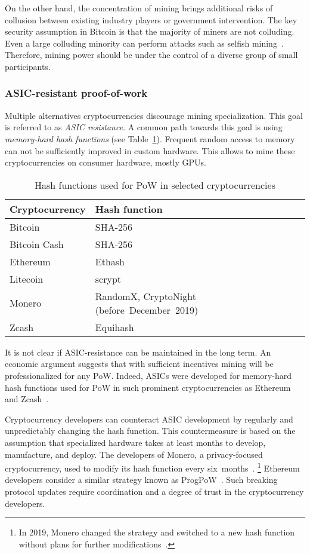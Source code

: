 On the other hand, the concentration of mining brings additional risks of collusion between existing industry players or government intervention.
The key security assumption in Bitcoin is that the majority of miners are not colluding.
Even a large colluding minority can perform attacks such as selfish mining~\cite{Eyal2018}.
Therefore, mining power should be under the control of a diverse group of small participants.


\subsubsection*{ASIC-resistant proof-of-work}

Multiple alternatives cryptocurrencies discourage mining specialization.
This goal is referred to as \textit{ASIC resistance}.
A common path towards this goal is using \textit{memory-hard hash functions} (see Table~\ref{tab:pow-coins-hash-functions}).
Frequent random access to memory can not be sufficiently improved in custom hardware.
This allows to mine these cryptocurrencies on consumer hardware, mostly GPUs.

\begin{table}[]
	\begin{tabular}{|l|l|}
		\hline
		\textbf{Cryptocurrency} & \textbf{Hash function} \\ \hline
		Bitcoin & SHA-256 \\ \hline
		Bitcoin Cash & SHA-256 \\ \hline
		Ethereum & Ethash \\ \hline
		Litecoin & scrypt \\ \hline
		Monero & RandomX, CryptoNight (before~December~2019) \\ \hline
		Zcash & Equihash \\ \hline
	\end{tabular}
	\caption{Hash functions used for PoW in selected cryptocurrencies}
	\label{tab:pow-coins-hash-functions}
\end{table}

It is not clear if ASIC-resistance can be maintained in the long term.
An economic argument suggests that with sufficient incentives mining will be professionalized for any PoW.
Indeed, ASICs were developed for memory-hard hash functions used for PoW in such prominent cryptocurrencies as Ethereum~\cite{OLeary2018} and Zcash~\cite{Floyd2018}.

Cryptocurrency developers can counteract ASIC development by regularly and unpredictably changing the hash function.
This countermeasure is based on the assumption that specialized hardware takes at least months to develop, manufacture, and deploy.
The developers of Monero, a privacy-focused cryptocurrency, used to modify its hash function every six~months~\cite{Kim2019}.
\footnote{In 2019, Monero changed the strategy and switched to a new hash function without plans for further modifications~\cite{dEBRUYNE2019}.}
Ethereum developers consider a similar strategy known as ProgPoW~\cite{OLeary2019}.
Such breaking protocol updates require coordination and a degree of trust in the cryptocurrency developers.


